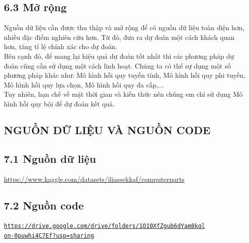 \documentclass[a4paper]{article}
\newcommand{\gachdau}{\hspace*{1.5em}\ignorespaces}
\begin{document}
        \vspace{-7pt}
        \subsection*{6.3 Mở rộng}
            \vspace{-4pt}
            \gachdau
            Nguồn dữ liệu cần được thu thập và mở rộng để có nguồn dữ liệu toàn diện hơn, nhiều đặc điểm nghiên cứu hơn. Từ đó, đưa ra dự đoán một cách khách quan hơn, tăng tỉ lệ chính xác cho dự đoán.\\
            \gachdau
            Bên cạnh đó, để mang lại hiệu quả dự đoán tốt nhất thì các phương pháp dự đoán cũng cần sử dụng một cách linh hoạt. Chúng ta có thể sự dụng một số phương pháp khác như: Mô hình hồi quy tuyến tính, Mô hình hồi quy phi tuyến, Mô hình hồi quy lựa chọn, Mô hình hồi quy đa cấp,...\\
            \gachdau
            Tuy nhiên, hạn chế về mặt thời gian và kiến thức nên chúng em chỉ sử dụng Mô hình hồi quy bội để dự đoán kết quả. 

\newpage
    \begin{center}
        \section*{NGUỒN DỮ LIỆU VÀ NGUỒN CODE}
    \end{center}
        \subsection*{7.1 Nguồn dữ liệu}
            \url{https://www.kaggle.com/datasets/iliassekkaf/computerparts}

        \subsection*{7.2 Nguồn code}
            \href{https://drive.google.com/drive/folders/1O10XfZgub6dYam8kqlon-0puwhi4C7Ef?usp=sharing}{\nolinkurl{https://drive.google.com/drive/folders/1O10XfZgub6dYam8kql}} \\
            \href{https://drive.google.com/drive/folders/1O10XfZgub6dYam8kqlon-0puwhi4C7Ef?usp=sharing}{\nolinkurl{on-0puwhi4C7Ef?usp=sharing}}       
            
\end{document}
